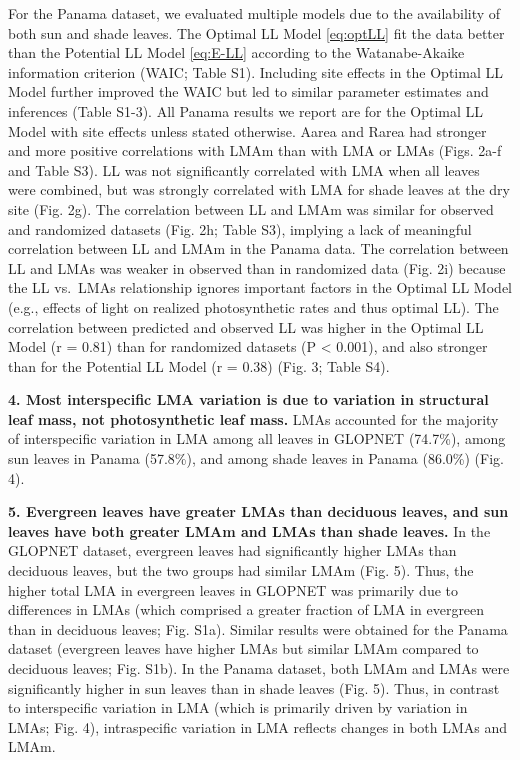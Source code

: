 \documentclass[12pt,]{article}
\theoremstyle{definition}
\theoremstyle{definition}
\theoremstyle{definition}
\theoremstyle{remark}
\begin{document}
For the Panama dataset, we evaluated multiple models due to the
availability of both sun and shade leaves. The Optimal LL Model
\eqref{eq:optLL} fit the data better than the Potential LL Model
\eqref{eq:E-LL} according to the Watanabe-Akaike information criterion
(WAIC; Table S1). Including site effects in the Optimal LL Model further
improved the WAIC but led to similar parameter estimates and inferences
(Table S1-3). All Panama results we report are for the Optimal LL Model
with site effects unless stated otherwise. Aarea and Rarea had stronger
and more positive correlations with LMAm than with LMA or LMAs (Figs.
2a-f and Table S3). LL was not significantly correlated with LMA when
all leaves were combined, but was strongly correlated with LMA for shade
leaves at the dry site (Fig. 2g). The correlation between LL and LMAm
was similar for observed and randomized datasets (Fig. 2h; Table S3),
implying a lack of meaningful correlation between LL and LMAm in the
Panama data. The correlation between LL and LMAs was weaker in observed
than in randomized data (Fig. 2i) because the LL vs.~LMAs relationship
ignores important factors in the Optimal LL Model (e.g., effects of
light on realized photosynthetic rates and thus optimal LL). The
correlation between predicted and observed LL was higher in the Optimal
LL Model (r = 0.81) than for randomized datasets (P \textless{} 0.001),
and also stronger than for the Potential LL Model (r = 0.38) (Fig. 3;
Table S4).

\textbf{4. Most interspecific LMA variation is due to variation in
structural leaf mass, not photosynthetic leaf mass.} LMAs accounted for
the majority of interspecific variation in LMA among all leaves in
GLOPNET (74.7\%), among sun leaves in Panama (57.8\%), and among shade
leaves in Panama (86.0\%) (Fig. 4).

\textbf{5. Evergreen leaves have greater LMAs than deciduous leaves, and
sun leaves have both greater LMAm and LMAs than shade leaves.} In the
GLOPNET dataset, evergreen leaves had significantly higher LMAs than
deciduous leaves, but the two groups had similar LMAm (Fig. 5). Thus,
the higher total LMA in evergreen leaves in GLOPNET was primarily due to
differences in LMAs (which comprised a greater fraction of LMA in
evergreen than in deciduous leaves; Fig. S1a). Similar results were
obtained for the Panama dataset (evergreen leaves have higher LMAs but
similar LMAm compared to deciduous leaves; Fig. S1b). In the Panama
dataset, both LMAm and LMAs were significantly higher in sun leaves than
in shade leaves (Fig. 5). Thus, in contrast to interspecific variation
in LMA (which is primarily driven by variation in LMAs; Fig. 4),
intraspecific variation in LMA reflects changes in both LMAs and LMAm.
\end{document}
